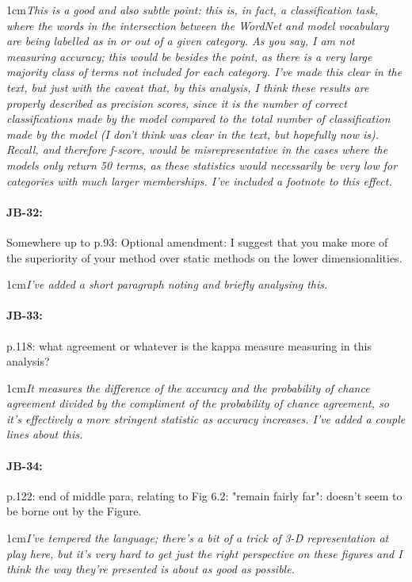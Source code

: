 \documentclass[11pt,a4paper]{article}
\newcommand{\res}[1]{\vspace{0.25cm} \begin{adjustwidth}{1cm}{}\emph{#1}\end{adjustwidth}}
\begin{document}
\res{This is a good and also subtle point: this is, in fact, a classification task, where the words in the intersection between the WordNet and model vocabulary are being labelled as in or out of a given category.  As you say, I am not measuring accuracy; this would be besides the point, as there is a very large majority class of terms not included for each category.  I've made this clear in the text, but just with the caveat that, by this analysis, I think these results are properly described as precision scores, since it is the number of correct classifications made by the model compared to the total number of classification made by the model (I don't think was clear in the text, but hopefully now is).  Recall, and therefore f-score, would be misrepresentative in the cases where the models only return 50 terms, as these statistics would necessarily be very low for categories with much larger memberships.  I've included a footnote to this effect.}

\paragraph{JB-32:} Somewhere up to p.93: Optional amendment: I suggest that you make more of the superiority of your method over static methods on the lower dimensionalities.

\res{I've added a short paragraph noting and briefly analysing this.}

\paragraph{JB-33:} p.118: what agreement or whatever is the kappa measure measuring in this analysis?

\res{It measures the difference of the accuracy and the probability of chance agreement divided by the compliment of the probability of chance agreement, so it's effectively a more stringent statistic as accuracy increases.  I've added a couple lines about this.}

\paragraph{JB-34:} p.122: end of middle para, relating to Fig 6.2: "remain fairly far": doesn't seem to be borne out by the Figure.

\res{I've tempered the language; there's a bit of a trick of 3-D representation at play here, but it's very hard to get just the right perspective on these figures and I think the way they're presented is about as good as possible.}
\end{document}
